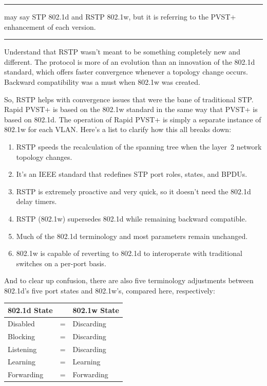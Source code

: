 \begin{center}\rule{0.5\linewidth}{0.5pt}\end{center}

may say STP 802.1d and RSTP 802.1w, but it is referring to the PVST+
enhancement of each version.

\begin{center}\rule{0.5\linewidth}{0.5pt}\end{center}

Understand that RSTP wasn't meant to be something completely new and
different. The protocol is more of an evolution than an innovation of
the 802.1d standard, which offers faster convergence whenever a topology
change occurs. Backward compatibility was a must when 802.1w was
created.

So, RSTP helps with convergence issues that were the bane of traditional
STP. Rapid PVST+ is based on the 802.1w standard in the same way that
PVST+ is based on 802.1d. The operation of Rapid PVST+ is simply a
separate instance of 802.1w for each VLAN. Here's a list to clarify how
this all breaks down:

\begin{enumerate}
\tightlist
\item
  RSTP speeds the recalculation of the spanning tree when the layer~2
  network topology changes.
\item
  It's an IEEE standard that redefines STP port roles, states, and
  BPDUs.
\item
  RSTP is extremely proactive and very quick, so it doesn't need the
  802.1d delay timers.
\item
  RSTP (802.1w) supersedes 802.1d while remaining backward compatible.
\item
  Much of the 802.1d terminology and most parameters remain unchanged.
\item
  802.1w is capable of reverting to 802.1d to interoperate with
  traditional switches on a per-port basis.
\end{enumerate}

And to clear up
confusion, there are also five terminology adjustments between 802.1d's
five port states and 802.1w's, compared here, respectively:

\begin{longtable}[]{@{}lll@{}}
\toprule
802.1d State & & 802.1w State\tabularnewline
\midrule
\endhead
Disabled & = & Discarding\tabularnewline
Blocking & = & Discarding\tabularnewline
Listening & = & Discarding\tabularnewline
Learning & = & Learning\tabularnewline
Forwarding & = & Forwarding\tabularnewline
\bottomrule
\end{longtable}

